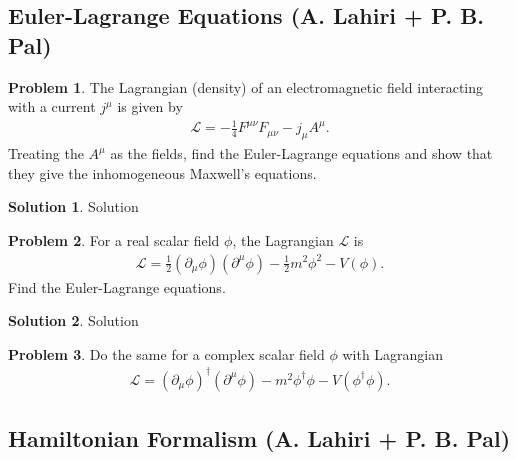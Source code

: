\documentclass[a4paper,11pt]{article}
\numberwithin{equation}{section}
\theoremstyle{definition}
\newtheorem{prob}{Problem}[section]
\newtheorem{sln}{Solution}[section]
\newcommand{\p}{\partial}
\newcommand{\lag}{\mathcal{L}}
\begin{document}
\newpage


\subsection{Euler-Lagrange Equations (A. Lahiri + P. B. Pal)}

\begin{prob}
	The Lagrangian (density) of an electromagnetic field interacting with a current $j^\mu$ is given by
	\begin{align}
	\lag = -\frac{1}{4}F^{\mu\nu}F_{\mu\nu} - j_\mu A^\mu.
	\end{align}
	Treating the $A^\mu$ as the fields, find the Euler-Lagrange equations and show that they give the inhomogeneous Maxwell's equations.\\
	
	\begin{sln}
		Solution
	\end{sln}
\end{prob}






\newpage

\begin{prob}
	For a real scalar field $\phi$, the Lagrangian $\lag$ is 
	\begin{align}
	\lag = \frac{1}{2}(\p_\mu\phi)(\p^\mu\phi) - \frac{1}{2}m^2\phi^2 - V(\phi).
	\end{align}
	Find the Euler-Lagrange equations.\\
	
	\begin{sln}
		Solution
	\end{sln}
\end{prob}



\newpage




\begin{prob}
	Do the same for a complex scalar field $\phi$ with Lagrangian
	\begin{align}
	\lag = (\p_\mu\phi)^\dagger(\p^\mu\phi) - m^2\phi^\dagger\phi - V(\phi^\dagger\phi).
	\end{align}
\end{prob}









\newpage


\subsection{Hamiltonian Formalism (A. Lahiri + P. B. Pal)}
\end{document}
